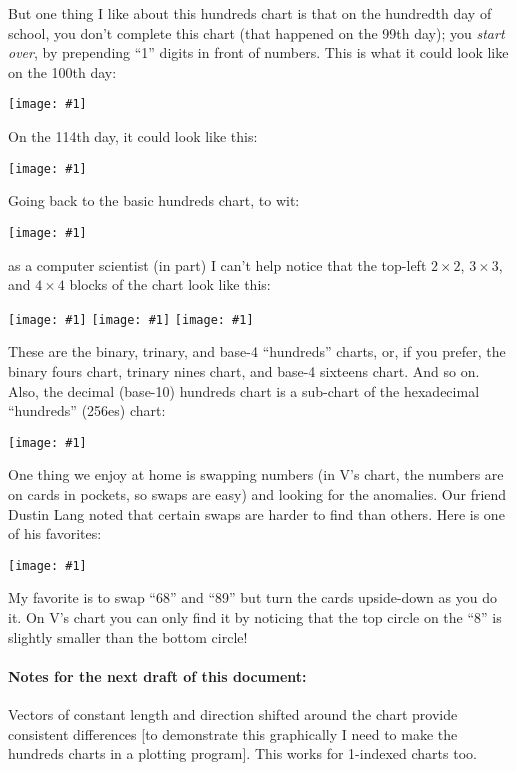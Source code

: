 \documentclass[12pt]{article}
\newcommand{\showchart}[1]{\texttt{[image: \#1]}}
\begin{document}
But one thing I like about this hundreds chart is that on the
hundredth day of school, you don't complete this chart (that happened
on the 99th day); you \emph{start over}, by prepending ``1'' digits in
front of numbers.  This is what it could look like on the 100th day:
\begin{center}
\showchart{hundreds_chart_day100.pdf}
\end{center}
On the 114th day, it could look like this:
\begin{center}
\showchart{hundreds_chart_day114.pdf}
\end{center}

Going back to the basic hundreds chart, to wit:
\begin{center}
\showchart{hundreds_chart_default.pdf}
\end{center}
as a computer scientist (in part) I can't help notice that the
top-left $2\times 2$, $3\times 3$, and $4\times 4$ blocks of the
chart look like this:
\begin{center}
\showchart{hundreds_chart_2x2_base2.pdf}
\quad
\showchart{hundreds_chart_3x3_base3.pdf}
\quad
\showchart{hundreds_chart_4x4_base4.pdf}
\end{center}
These are the binary, trinary, and base-4 ``hundreds'' charts, or, if
you prefer, the binary fours chart, trinary nines chart, and base-4
sixteens chart.  And so on.  Also, the decimal (base-10) hundreds
chart is a sub-chart of the hexadecimal ``hundreds'' (256es) chart:
\begin{center}
\showchart{hundreds_chart_16x16_base16.pdf}
\end{center}

One thing we enjoy at home is swapping numbers (in V's chart, the
numbers are on cards in pockets, so swaps are easy) and looking for
the anomalies.  Our friend Dustin Lang noted that certain swaps are
harder to find than others.  Here is one of his favorites:
\begin{center}
\showchart{hundreds_chart_swap14.pdf}
\end{center}
My favorite is to swap ``68'' and ``89'' but turn the cards
upside-down as you do it.  On V's chart you can only find it by
noticing that the top circle on the ``8'' is slightly smaller than the
bottom circle!

\paragraph{Notes for the next draft of this document:}
Vectors of constant length and direction shifted around the chart
provide consistent differences [to demonstrate this graphically I need
  to make the hundreds charts in a plotting program].  This works for
1-indexed charts too.
\end{document}
